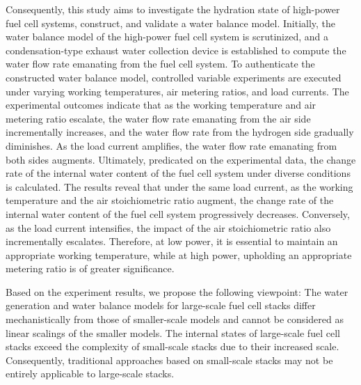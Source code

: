 \par
Consequently, this study aims to investigate the hydration state of high-power fuel cell systems, construct, and validate a water balance model. Initially, the water balance model of the high-power fuel cell system is scrutinized, and a condensation-type exhaust water collection device is established to compute the water flow rate emanating from the fuel cell system.
To authenticate the constructed water balance model, controlled variable experiments are executed under varying working temperatures, air metering ratios, and load currents. The experimental outcomes indicate that as the working temperature and air metering ratio escalate, the water flow rate emanating from the air side incrementally increases, and the water flow rate from the hydrogen side gradually diminishes.
As the load current amplifies, the water flow rate emanating from both sides augments. Ultimately, predicated on the experimental data, the change rate of the internal water content of the fuel cell system under diverse conditions is calculated. The results reveal that under the same load current, as the working temperature and the air stoichiometric ratio augment, the change rate of the internal water content of the fuel cell system progressively decreases.
Conversely, as the load current intensifies, the impact of the air stoichiometric ratio also incrementally escalates. Therefore, at low power, it is essential to maintain an appropriate working temperature, while at high power, upholding an appropriate metering ratio is of greater significance.

\par
Based on the experiment results, we propose the following viewpoint: The water generation and water balance models for large-scale fuel cell stacks differ mechanistically from those of smaller-scale models and cannot be considered as linear scalings of the smaller models. The internal states of large-scale fuel cell stacks exceed the complexity of small-scale stacks due to their increased scale. Consequently, traditional approaches based on small-scale stacks may not be entirely applicable to large-scale stacks.
